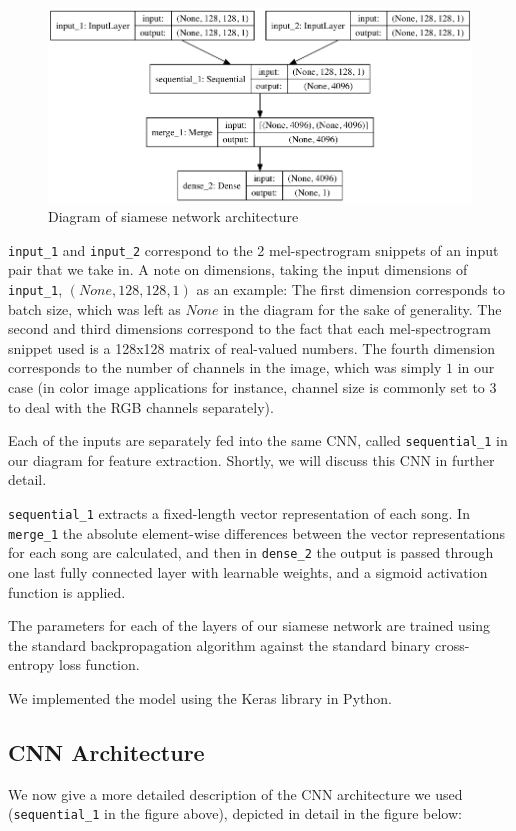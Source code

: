 \begin{figure}[H]
\includegraphics[width=\textwidth]{figures/siamese.png}
\caption{Diagram of siamese network architecture}
\end{figure}

\texttt{input\_1} and \texttt{input\_2} correspond to the 2 mel-spectrogram snippets of an input pair that we take in. A note on dimensions, taking the input dimensions of \texttt{input\_1}, $(None, 128,128,1)$ as an example: The first dimension corresponds to batch size, which was left as $None$ in the diagram for the sake of generality. The second and third dimensions correspond to the fact that each mel-spectrogram snippet used is a 128x128 matrix of real-valued numbers. The fourth dimension corresponds to the number of channels in the image, which was simply $1$ in our case (in color image applications for instance, channel size is commonly set to $3$ to deal with the RGB channels separately).

Each of the inputs are separately fed into the same CNN, called \texttt{sequential\_1} in our diagram for feature extraction. Shortly, we will discuss this CNN in further detail.

\texttt{sequential\_1} extracts a fixed-length vector representation of each song. In \texttt{merge\_1} the absolute element-wise differences between the vector representations for each song are calculated, and then in \texttt{dense\_2} the output is passed through one last fully connected layer with learnable weights, and a sigmoid activation function is applied.

The parameters for each of the layers of our siamese network are trained using the standard backpropagation algorithm against the standard binary cross-entropy loss function.

We implemented the model using the Keras library\cite{chollet2015keras} in Python.

\subsection{CNN Architecture}
We now give a more detailed description of the CNN architecture we used (\texttt{sequential\_1} in the figure above), depicted in detail in the figure below:


